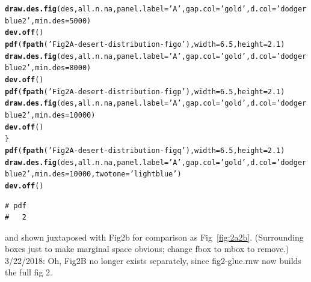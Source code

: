 \documentclass{article}\usepackage[]{graphicx}\usepackage[]{color}
\makeatletter
\newcommand{\hlnum}[1]{\textcolor[rgb]{0.686,0.059,0.569}{#1}}%
\newcommand{\hlstr}[1]{\textcolor[rgb]{0.192,0.494,0.8}{#1}}%
\newcommand{\hlstd}[1]{\textcolor[rgb]{0.345,0.345,0.345}{#1}}%
\newcommand{\hlkwc}[1]{\textcolor[rgb]{0.333,0.667,0.333}{#1}}%
\newcommand{\hlkwd}[1]{\textcolor[rgb]{0.737,0.353,0.396}{\textbf{#1}}}%
\newenvironment{kframe}{%
 \def\at@end@of@kframe{}%
 \ifinner\ifhmode%
  \def\at@end@of@kframe{\end{minipage}}%
  \begin{minipage}{\columnwidth}%
 \fi\fi%
 \def\FrameCommand##1{\hskip\@totalleftmargin \hskip-\fboxsep
 \colorbox{shadecolor}{##1}\hskip-\fboxsep
     \hskip-\linewidth \hskip-\@totalleftmargin \hskip\columnwidth}%
 \MakeFramed {\advance\hsize-\width
   \@totalleftmargin\z@ \linewidth\hsize
   \@setminipage}}%
 {\par\unskip\endMakeFramed%
 \at@end@of@kframe}
\newenvironment{knitrout}{}{} %
\makeatother
\begin{document}
\begin{knitrout}
\begin{kframe}
\begin{alltt}
  \hlkwd{draw.des.fig}\hlstd{(des, all.n.na,} \hlkwc{panel.label}\hlstd{=}\hlstr{'A'}\hlstd{,}\hlkwc{gap.col} \hlstd{=} \hlstr{'gold'}\hlstd{,}\hlkwc{d.col}\hlstd{=}\hlstr{'dodgerblue2'}\hlstd{,}\hlkwc{min.des}\hlstd{=}\hlnum{5000}\hlstd{)}
  \hlkwd{dev.off}\hlstd{()}
  \hlkwd{pdf}\hlstd{(}\hlkwd{fpath}\hlstd{(}\hlstr{'Fig2A-desert-distribution-figo'}\hlstd{),} \hlkwc{width}\hlstd{=}\hlnum{6.5}\hlstd{,} \hlkwc{height}\hlstd{=}\hlnum{2.1}\hlstd{)}
  \hlkwd{draw.des.fig}\hlstd{(des, all.n.na,} \hlkwc{panel.label}\hlstd{=}\hlstr{'A'}\hlstd{,}\hlkwc{gap.col} \hlstd{=} \hlstr{'gold'}\hlstd{,}\hlkwc{d.col}\hlstd{=}\hlstr{'dodgerblue2'}\hlstd{,}\hlkwc{min.des}\hlstd{=}\hlnum{8000}\hlstd{)}
  \hlkwd{dev.off}\hlstd{()}
  \hlkwd{pdf}\hlstd{(}\hlkwd{fpath}\hlstd{(}\hlstr{'Fig2A-desert-distribution-figp'}\hlstd{),} \hlkwc{width}\hlstd{=}\hlnum{6.5}\hlstd{,} \hlkwc{height}\hlstd{=}\hlnum{2.1}\hlstd{)}
  \hlkwd{draw.des.fig}\hlstd{(des, all.n.na,} \hlkwc{panel.label}\hlstd{=}\hlstr{'A'}\hlstd{,}\hlkwc{gap.col} \hlstd{=} \hlstr{'gold'}\hlstd{,}\hlkwc{d.col}\hlstd{=}\hlstr{'dodgerblue2'}\hlstd{,}\hlkwc{min.des}\hlstd{=}\hlnum{10000}\hlstd{)}
  \hlkwd{dev.off}\hlstd{()}
\hlstd{\}}
\hlkwd{pdf}\hlstd{(}\hlkwd{fpath}\hlstd{(}\hlstr{'Fig2A-desert-distribution-figq'}\hlstd{),} \hlkwc{width}\hlstd{=}\hlnum{6.5}\hlstd{,} \hlkwc{height}\hlstd{=}\hlnum{2.1}\hlstd{)}
\hlkwd{draw.des.fig}\hlstd{(des, all.n.na,} \hlkwc{panel.label}\hlstd{=}\hlstr{'A'}\hlstd{,}\hlkwc{gap.col} \hlstd{=} \hlstr{'gold'}\hlstd{,}\hlkwc{d.col}\hlstd{=}\hlstr{'dodgerblue2'}\hlstd{,}\hlkwc{min.des}\hlstd{=}\hlnum{10000}\hlstd{,}\hlkwc{twotone}\hlstd{=}\hlstr{'lightblue'}\hlstd{)}
\hlkwd{dev.off}\hlstd{()}
\end{alltt}
\begin{verbatim}
# pdf 
#   2
\end{verbatim}
\end{kframe}
\end{knitrout}
\noindent and shown juxtaposed with Fig2b for comparison as Fig~\ref{fig:2a2b}.  (Surrounding boxes just to make marginal space obvious; change fbox to mbox to remove.)
\\ 3/22/2018: Oh, Fig2B no longer exists separately, since fig2-glue.rnw now builds the full fig 2.
\end{document}
